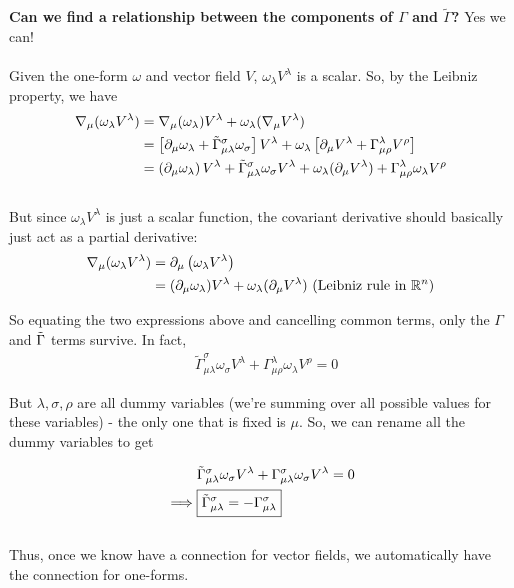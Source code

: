 \documentclass[11pt]{article}
\begin{document}
\vskip 0.5cm
\textbf{Can we find a relationship between the components of $\Gamma$ and $\tilde{\Gamma}$?}
Yes we can! 
\\
\\
Given the one-form $\omega$ and vector field $V$, $\omega_{\lambda} V^{\lambda}$ is a scalar. So, by the Leibniz property, we have 
\begin{align*}
  \nabla_{\mu} (\omega_{\lambda} V^{\lambda}) &= \nabla_{\mu}(\omega_{\lambda}) V^{\lambda} + \omega_{\lambda} (\nabla_{\mu} V^{\lambda}) \\
  &= \left[ \partial_{\mu} \omega_{\lambda} + \Tilde{\Gamma}_{\mu \lambda}^{\sigma} \omega_{\sigma} \right] V^{\lambda} + \omega_{\lambda} \left[ \partial_{\mu} V^{\lambda} + \Gamma_{\mu \rho}^{\lambda} V^{\rho} \right] \\
  &= \left(\partial_{\mu} \omega_{\lambda}\right) V^{\lambda} + \Tilde{\Gamma}_{\mu \lambda}^{\sigma} \omega_{\sigma} V^{\lambda} + \omega_{\lambda} (\partial_{\mu} V^{\lambda} ) + \Gamma_{\mu \rho}^{\lambda}  \omega_{\lambda} V^{\rho} 
\end{align*}
\\
But since $\omega_{\lambda} V^{\lambda}$ is just a scalar function, the covariant derivative should basically just act as a partial derivative:
\begin{align*}
  \nabla_{\mu} (\omega_{\lambda} V^{\lambda}) &= \partial_{\mu} \left(\omega_{\lambda} V^{\lambda}\right) \\
  &= (\partial_{\mu} \omega_{\lambda}) V^{\lambda} + \omega_{\lambda} (\partial_{\mu} V^{\lambda}) \text{  (Leibniz rule in $\mathbb{R}^n$)} \\
\end{align*}

So equating the two expressions above and cancelling common terms, only the $\Gamma$ and $\Tilde{\Gamma}$ terms survive. In fact,
\begin{align*}
  &\tilde{\Gamma}_{\mu \lambda}^{\sigma} \omega_{\sigma} V^{\lambda} + \Gamma_{\mu \rho}^{\lambda}  \omega_{\lambda} V^{\rho} = 0 
\end{align*}

But $\lambda, \sigma, \rho$ are all dummy variables (we're summing over all possible values for these variables) - the only one that is fixed is $\mu$. So, we can rename all the dummy variables to get 

\begin{align*}
  &\Tilde{\Gamma}_{\mu \lambda}^{\sigma} \omega_{\sigma} V^{\lambda} + \Gamma_{\mu \lambda}^{\sigma} \omega_{\sigma} V^{\lambda} = 0\\ 
  \implies& \boxed{\Tilde{\Gamma}_{\mu \lambda}^{\sigma} = - \Gamma_{\mu \lambda}^{\sigma}}
\end{align*}
\\
Thus, once we know have a connection for vector fields, we automatically have the connection for one-forms.
\\
\\
\end{document}
